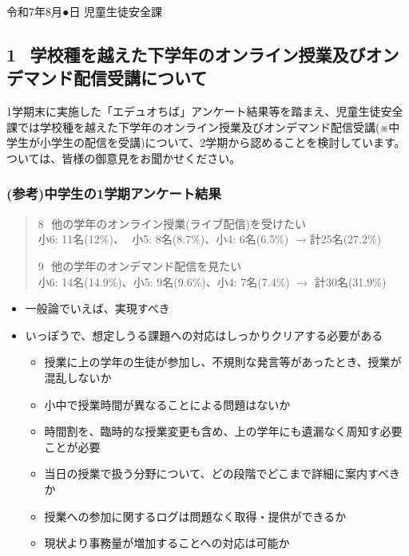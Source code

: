 \documentclass[12pt,jafontscale=0.9247]{jlreq}
\begin{document}



\hfill{}令和7年8月●日 児童生徒安全課


\subsection*{1\,\,\,\,\,学校種を越えた下学年のオンライン授業及びオンデマンド配信受講について}
 1学期末に実施した「エデュオちば」アンケート結果等を踏まえ、児童生徒安全課では学校種を越えた下学年のオンライン授業及びオンデマンド配信受講(※中学生が小学生の配信を受講)について、2学期から認めることを検討しています。ついては、皆様の御意見をお聞かせください。

\subsubsection*{(参考)中学生の1学期アンケート結果}

\begin{quote}
 \noindent{}8\,\,\,\,他の学年のオンライン授業(ライブ配信)を受けたい\\
 小6:\,\,11名(12\%)、\,\,\,\,小5:\,\,8名(8.7\%)、小4:\,\,6名(6.5\%) $\longrightarrow$計25名(27.2\%)

\smallskip

\noindent{}9\,\,\,\,他の学年のオンデマンド配信を見たい\\
 小6:\,\,14名(14.9\%)、小5:\,\,9名(9.6\%)、小4:\,\,7名(7.4\%) $\longrightarrow$ 計30名(31.9\%)
\end{quote}

\begin{tcolorbox}[title=意見]
\begin{itemize}
 \item 一般論でいえば、実現すべき
 \item いっぽうで、想定しうる課題への対応はしっかりクリアする必要がある
       \begin{itemize}
	\item 授業に上の学年の生徒が参加し、不規則な発言等があったとき、授業が混乱しないか
	\item 小中で授業時間が異なることによる問題はないか
	\item 時間割を、臨時的な授業変更も含め、上の学年にも遺漏なく周知す必要ことが必要
	\item 当日の授業で扱う分野について、どの段階でどこまで詳細に案内すべきか
	\item 授業への参加に関するログは問題なく取得・提供ができるか
	\item 現状より事務量が増加することへの対応は可能か
       \end{itemize}
\end{itemize}
\end{tcolorbox}
\end{document}
